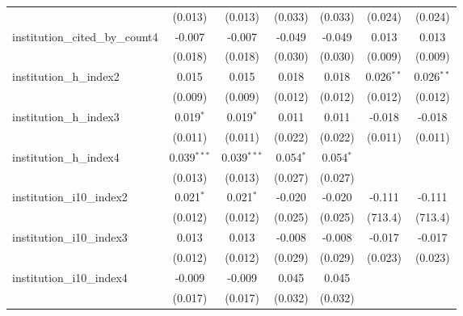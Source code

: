 \begin{tabular}{lcccccc}
                                         & (0.013)        & (0.013)        & (0.033)        & (0.033)        & (0.024)       & (0.024)\\   
   institution\_cited\_by\_count4        & -0.007         & -0.007         & -0.049         & -0.049         & 0.013         & 0.013\\   
                                         & (0.018)        & (0.018)        & (0.030)        & (0.030)        & (0.009)       & (0.009)\\   
   institution\_h\_index2                & 0.015          & 0.015          & 0.018          & 0.018          & 0.026$^{**}$  & 0.026$^{**}$\\   
                                         & (0.009)        & (0.009)        & (0.012)        & (0.012)        & (0.012)       & (0.012)\\   
   institution\_h\_index3                & 0.019$^{*}$    & 0.019$^{*}$    & 0.011          & 0.011          & -0.018        & -0.018\\   
                                         & (0.011)        & (0.011)        & (0.022)        & (0.022)        & (0.011)       & (0.011)\\   
   institution\_h\_index4                & 0.039$^{***}$  & 0.039$^{***}$  & 0.054$^{*}$    & 0.054$^{*}$    &               &   \\   
                                         & (0.013)        & (0.013)        & (0.027)        & (0.027)        &               &   \\   
   institution\_i10\_index2              & 0.021$^{*}$    & 0.021$^{*}$    & -0.020         & -0.020         & -0.111        & -0.111\\   
                                         & (0.012)        & (0.012)        & (0.025)        & (0.025)        & (713.4)       & (713.4)\\   
   institution\_i10\_index3              & 0.013          & 0.013          & -0.008         & -0.008         & -0.017        & -0.017\\   
                                         & (0.012)        & (0.012)        & (0.029)        & (0.029)        & (0.023)       & (0.023)\\   
   institution\_i10\_index4              & -0.009         & -0.009         & 0.045          & 0.045          &               &   \\   
                                         & (0.017)        & (0.017)        & (0.032)        & (0.032)        &               &   \\   

\end{tabular}
